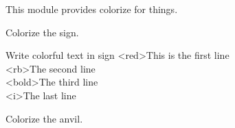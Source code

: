 
This module provides colorize for things.

Colorize the sign.

\begin{example}{Write colorful text in sign}
    <red>This is the first line\\
    <rb>The second line\\
    <bold>The third line\\
    <i>The last line
\end{example}

\clearpage
{}
Colorize the anvil.


